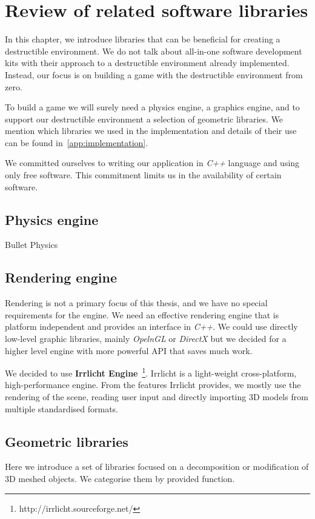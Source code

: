 \chapter{Review of related software libraries}
\label{chapt:technology}
In this chapter, we introduce libraries that can be beneficial for creating a destructible environment. We do not talk about all-in-one software development kits with their approach to a destructible environment already implemented. Instead, our focus is on building a game with the destructible environment from zero.  

To build a game we will surely need a physics engine, a graphics engine, and to support our destructible environment a selection of geometric libraries. We mention which libraries we used in the implementation and details of their use can be found in~\cref{app:implementation}.

We committed ourselves to writing our application in \emph{C++} language and using only free software. This commitment limits us in the availability of certain software. 

\section{Physics engine}
Bullet Physics


\section{Rendering engine}
Rendering is not a primary focus of this thesis, and we have no special requirements for the engine. We need an effective rendering engine that is platform independent and provides an interface in \emph{C++}. We could use directly low-level graphic libraries, mainly \emph{OpelnGL} or \emph{DirectX} but we decided for a higher level engine with more powerful API that saves much work.

We decided to use \textbf{Irrlicht Engine}~\footnote{http://irrlicht.sourceforge.net/}. Irrlicht is a light-weight cross-platform, high-performance engine. From the features Irrlicht provides, we mostly use the rendering of the scene, reading user input and directly importing 3D models from multiple standardised formats. 

\section{Geometric libraries}
Here we introduce a set of libraries focused on a decomposition or modification of 3D meshed objects. We categorise them by provided function.

